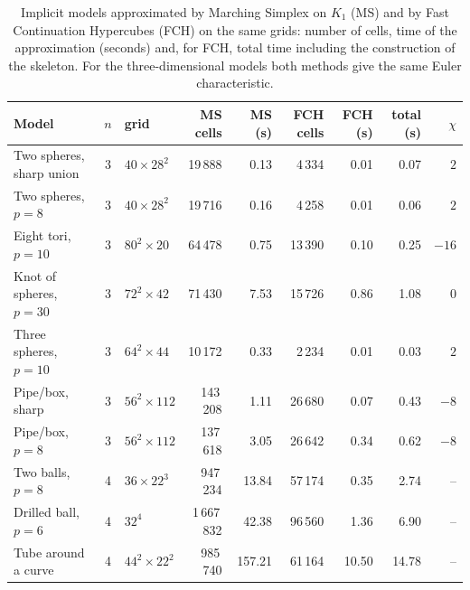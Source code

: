 \begin{table}[t]
\caption{Implicit models approximated by Marching Simplex on $K_1$ (MS) and by Fast Continuation Hypercubes
(FCH) on the same grids: number of cells, time of the approximation (seconds) and, for FCH, total time
including the construction of the skeleton. For the three-dimensional models both methods give the same
Euler characteristic.}
\label{tab:mod:runs}
\centering
\small
\setlength{\tabcolsep}{3.5pt}
\begin{tabular}{@{}lclrrrrrr@{}}
\toprule
Model & $n$ & grid & MS cells & MS (s) & FCH cells & FCH (s) & total (s) & $\chi$\\
\midrule
Two spheres, sharp union & 3 & $40\times28^2$ & 19\,888 & 0.13 & 4\,334 & 0.01 & 0.07 & $2$\\
Two spheres, $p=8$ & 3 & $40\times28^2$ & 19\,716 & 0.16 & 4\,258 & 0.01 & 0.06 & $2$\\
Eight tori, $p=10$ & 3 & $80^2\times20$ & 64\,478 & 0.75 & 13\,390 & 0.10 & 0.25 & $-16$\\
Knot of spheres, $p=30$ & 3 & $72^2\times42$ & 71\,430 & 7.53 & 15\,726 & 0.86 & 1.08 & $0$\\
Three spheres, $p=10$ & 3 & $64^2\times44$ & 10\,172 & 0.33 & 2\,234 & 0.01 & 0.03 & $2$\\
Pipe/box, sharp & 3 & $56^2\times112$ & 143\,208 & 1.11 & 26\,680 & 0.07 & 0.43 & $-8$\\
Pipe/box, $p=8$ & 3 & $56^2\times112$ & 137\,618 & 3.05 & 26\,642 & 0.34 & 0.62 & $-8$\\
Two balls, $p=8$ & 4 & $36\times22^3$ & 947\,234 & 13.84 & 57\,174 & 0.35 & 2.74 & --\\
Drilled ball, $p=6$ & 4 & $32^4$ & 1\,667\,832 & 42.38 & 96\,560 & 1.36 & 6.90 & --\\
Tube around a curve & 4 & $44^2\times22^2$ & 985\,740 & 157.21 & 61\,164 & 10.50 & 14.78 & --\\
\bottomrule
\end{tabular}
\end{table}
